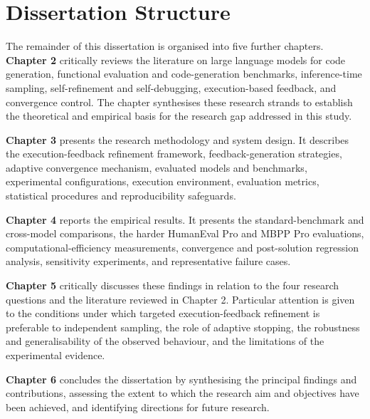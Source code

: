 \section{Dissertation Structure}

The remainder of this dissertation is organised into five further chapters. \textbf{Chapter 2} critically reviews the literature on large language models for code generation, functional evaluation and code-generation benchmarks, inference-time sampling, self-refinement and self-debugging, execution-based feedback, and convergence control. The chapter synthesises these research strands to establish the theoretical and empirical basis for the research gap addressed in this study.

\textbf{Chapter 3} presents the research methodology and system design. It describes the execution-feedback refinement framework, feedback-generation strategies, adaptive convergence mechanism, evaluated models and benchmarks, experimental configurations, execution environment, evaluation metrics, statistical procedures and reproducibility safeguards.

\textbf{Chapter 4} reports the empirical results. It presents the standard-benchmark and cross-model comparisons, the harder HumanEval Pro and MBPP Pro evaluations, computational-efficiency measurements, convergence and post-solution regression analysis, sensitivity experiments, and representative failure cases.

\textbf{Chapter 5} critically discusses these findings in relation to the four research questions and the literature reviewed in Chapter 2. Particular attention is given to the conditions under which targeted execution-feedback refinement is preferable to independent sampling, the role of adaptive stopping, the robustness and generalisability of the observed behaviour, and the limitations of the experimental evidence.

\textbf{Chapter 6} concludes the dissertation by synthesising the principal findings and contributions, assessing the extent to which the research aim and objectives have been achieved, and identifying directions for future research.

